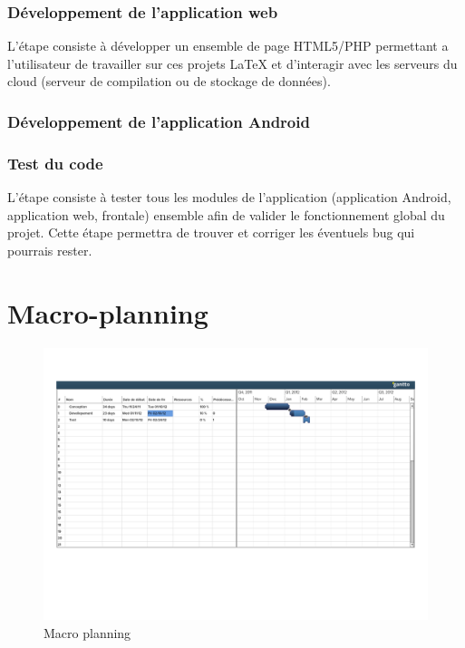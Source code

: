\documentclass[a4paper,12pt]{article}
\begin{document}
\subsubsection{Développement de l'application web}
L'étape consiste à développer un ensemble de page HTML5/PHP permettant a l'utilisateur de travailler sur ces projets LaTeX et d’interagir avec les serveurs du cloud (serveur de compilation ou de stockage de données).

\subsubsection{Développement de l'application Android}


\subsubsection{Test du code}
L'étape consiste à tester tous les modules de l'application (application Android, application web, frontale) ensemble afin de valider le fonctionnement global du projet. Cette étape permettra de trouver et corriger 
les éventuels bug qui pourrais rester.

\newpage
\section{Macro-planning}
\paragraph{}
\begin{figure}[!ht]
\begin{center}
  \includegraphics[width=1.2\textwidth, angle=90]{./Ressources/macroPlanning.pdf}
\end{center}
  \caption{Macro planning}
  \label{uiProject}
\end{figure}
\end{document}
